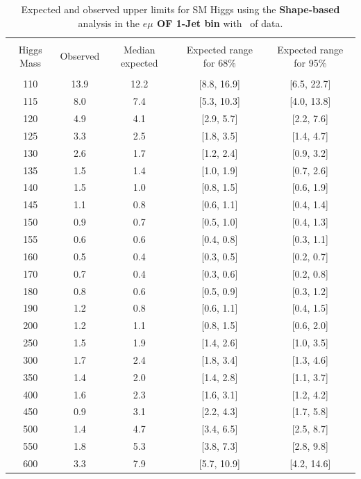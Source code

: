 \begin{table}[hbp!]
\begin{center}
\begin{tabular}{c c c c c}
\hline
\vspace{-3mm} && \\
 Higgs Mass & Observed  & Median expected & Expected range for 68\% & Expected range for 95\%   \\
\vspace{-3mm} && \\
\hline
110 & 13.9 & 12.2 & [8.8, 16.9] & [6.5, 22.7] \\
115 & 8.0 & 7.4 & [5.3, 10.3] & [4.0, 13.8] \\
120 & 4.9 & 4.1 & [2.9, 5.7] & [2.2, 7.6] \\
125 & 3.3 & 2.5 & [1.8, 3.5] & [1.4, 4.7] \\
130 & 2.6 & 1.7 & [1.2, 2.4] & [0.9, 3.2] \\
135 & 1.5 & 1.4 & [1.0, 1.9] & [0.7, 2.6] \\
140 & 1.5 & 1.0 & [0.8, 1.5] & [0.6, 1.9] \\
145 & 1.1 & 0.8 & [0.6, 1.1] & [0.4, 1.4] \\
150 & 0.9 & 0.7 & [0.5, 1.0] & [0.4, 1.3] \\
155 & 0.6 & 0.6 & [0.4, 0.8] & [0.3, 1.1] \\
160 & 0.5 & 0.4 & [0.3, 0.5] & [0.2, 0.7] \\
170 & 0.7 & 0.4 & [0.3, 0.6] & [0.2, 0.8] \\
180 & 0.8 & 0.6 & [0.5, 0.9] & [0.3, 1.2] \\
190 & 1.2 & 0.8 & [0.6, 1.1] & [0.4, 1.5] \\
200 & 1.2 & 1.1 & [0.8, 1.5] & [0.6, 2.0] \\
250 & 1.5 & 1.9 & [1.4, 2.6] & [1.0, 3.5] \\
300 & 1.7 & 2.4 & [1.8, 3.4] & [1.3, 4.6] \\
350 & 1.4 & 2.0 & [1.4, 2.8] & [1.1, 3.7] \\
400 & 1.6 & 2.3 & [1.6, 3.1] & [1.2, 4.2] \\
450 & 0.9 & 3.1 & [2.2, 4.3] & [1.7, 5.8] \\
500 & 1.4 & 4.7 & [3.4, 6.5] & [2.5, 8.7] \\
550 & 1.8 & 5.3 & [3.8, 7.3] & [2.8, 9.8] \\
600 & 3.3 & 7.9 & [5.7, 10.9] & [4.2, 14.6] \\
\hline
\end{tabular}
\caption{Expected and observed upper limits for SM Higgs using the
  {\bf Shape-based} analysis in the {\bf $e\mu$ OF 1-Jet bin} with \intlumiEightTeV\ of data.}
\label{tab:bdtbase_uls_1jof}
\end{center}
\end{table}


